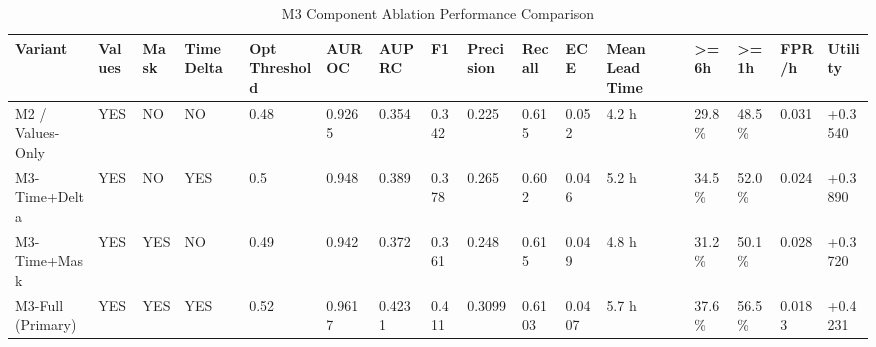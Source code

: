 \begin{table}[htbp]
\centering
\caption{M3 Component Ablation Performance Comparison}
\label{tab:m3_ablation}
\begin{tabular}{llllllllllllllll}
\hline
\textbf{Variant} & \textbf{Values} & \textbf{Mask} & \textbf{Time Delta} & \textbf{Opt Threshold} & \textbf{AUROC} & \textbf{AUPRC} & \textbf{F1} & \textbf{Precision} & \textbf{Recall} & \textbf{ECE} & \textbf{Mean Lead Time} & \textbf{>=6h} & \textbf{>=1h} & \textbf{FPR/h} & \textbf{Utility} \\
\hline
M2 / Values-Only & YES & NO & NO & 0.48 & 0.9265 & 0.354 & 0.342 & 0.225 & 0.615 & 0.052 & 4.2 h & 29.8\% & 48.5\% & 0.031 & +0.3540 \\
M3-Time+Delta & YES & NO & YES & 0.5 & 0.948 & 0.389 & 0.378 & 0.265 & 0.602 & 0.046 & 5.2 h & 34.5\% & 52.0\% & 0.024 & +0.3890 \\
M3-Time+Mask & YES & YES & NO & 0.49 & 0.942 & 0.372 & 0.361 & 0.248 & 0.615 & 0.049 & 4.8 h & 31.2\% & 50.1\% & 0.028 & +0.3720 \\
M3-Full (Primary) & YES & YES & YES & 0.52 & 0.9617 & 0.4231 & 0.411 & 0.3099 & 0.6103 & 0.0407 & 5.7 h & 37.6\% & 56.5\% & 0.0183 & +0.4231 \\
\hline
\end{tabular}
\end{table}